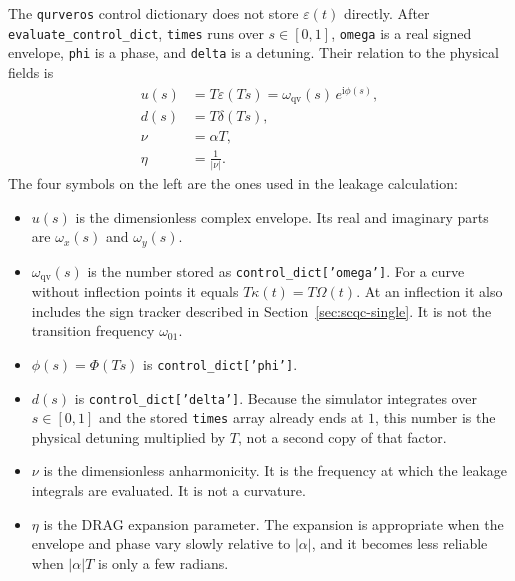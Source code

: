 \documentclass[11pt,a4paper]{article}
\theoremstyle{definition}
\newcommand{\abs}[1]{\lvert #1\rvert}
\newcommand{\ii}{\mathrm{i}}
\newcommand{\eps}{\varepsilon}
\begin{document}
The \texttt{qurveros} control dictionary does not store \(\eps(t)\) directly.
After \texttt{evaluate\_control\_dict}, \texttt{times} runs over \(s\in[0,1]\),
\texttt{omega} is a real signed envelope, \texttt{phi} is a phase, and
\texttt{delta} is a detuning.  Their relation to the physical fields is
\begin{equation}
\label{eq:normalized}
\begin{aligned}
  u(s)&=T\eps(Ts)=\omega_{\mathrm{qv}}(s)\,e^{\ii\phi(s)},\\
  d(s)&=T\delta(Ts),\\
  \nu&=\alpha T,\\
  \eta&=\frac{1}{\abs\nu}.
\end{aligned}
\end{equation}
The four symbols on the left are the ones used in the leakage calculation:
\begin{itemize}
  \item \(u(s)\) is the dimensionless complex envelope.  Its real and imaginary
        parts are \(\omega_x(s)\) and \(\omega_y(s)\).
  \item \(\omega_{\mathrm{qv}}(s)\) is the number stored as
        \texttt{control\_dict['omega']}.  For a curve without inflection
        points it equals \(T\kappa(t)=T\Omega(t)\).  At an inflection it also
        includes the sign tracker described in Section~\ref{sec:scqc-single}.
        It is not the transition frequency \(\omega_{01}\).
  \item \(\phi(s)=\Phi(Ts)\) is \texttt{control\_dict['phi']}.
  \item \(d(s)\) is \texttt{control\_dict['delta']}.  Because the simulator
        integrates over \(s\in[0,1]\) and the stored \texttt{times} array
        already ends at \(1\), this number is the physical detuning multiplied
        by \(T\), not a second copy of that factor.
  \item \(\nu\) is the dimensionless anharmonicity.  It is the frequency at
        which the leakage integrals are evaluated.  It is not a curvature.
  \item \(\eta\) is the DRAG expansion parameter.  The expansion is appropriate
        when the envelope and phase vary slowly relative to \(\abs\alpha\), and
        it becomes less reliable when \(\abs{\alpha}T\) is only a few radians.
\end{itemize}
\end{document}
